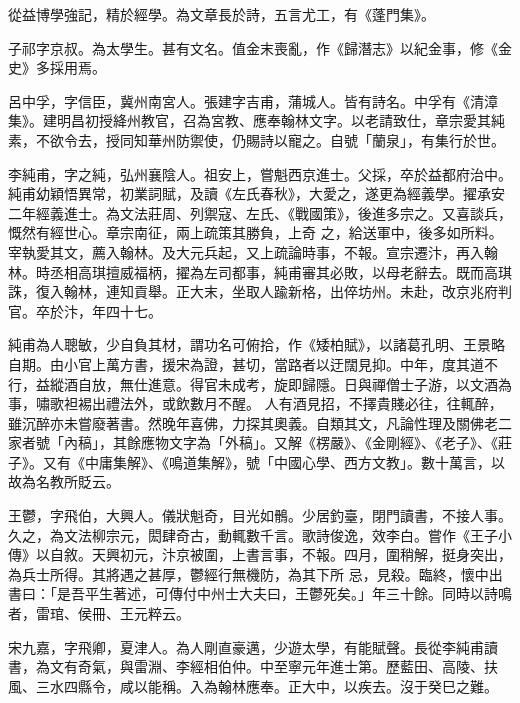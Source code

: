 \begin{pinyinscope}
 從益博學強記，精於經學。為文章長於詩，五言尤工，有《蓬門集》。



 子祁字京叔。為太學生。甚有文名。值金末喪亂，作《歸潛志》以紀金事，修《金史》多採用焉。



 呂中孚，字信臣，冀州南宮人。張建字吉甫，蒲城人。皆有詩名。中孚有《清漳集》。建明昌初授絳州教官，召為宮教、應奉翰林文字。以老請致仕，章宗愛其純素，不欲令去，授同知華州防禦使，仍賜詩以寵之。自號「蘭泉」，有集行於世。



 李純甫，字之純，弘州襄陰人。祖安上，嘗魁西京進士。父採，卒於益都府治中。純甫幼穎悟異常，初業詞賦，及讀《左氏春秋》，大愛之，遂更為經義學。擢承安二年經義進士。為文法莊周、列禦寇、左氏、《戰國策》，後進多宗之。又喜談兵，慨然有經世心。章宗南征，兩上疏策其勝負，上奇
 之，給送軍中，後多如所料。宰執愛其文，薦入翰林。及大元兵起，又上疏論時事，不報。宣宗遷汴，再入翰林。時丞相高琪擅威福柄，擢為左司都事，純甫審其必敗，以母老辭去。既而高琪誅，復入翰林，連知貢舉。正大末，坐取人踰新格，出倅坊州。未赴，改京兆府判官。卒於汴，年四十七。



 純甫為人聰敏，少自負其材，謂功名可俯拾，作《矮柏賦》，以諸葛孔明、王景略自期。由小官上萬方書，援宋為證，甚切，當路者以迂闊見抑。中年，度其道不行，益縱酒自放，無仕進意。得官未成考，旋即歸隱。日與禪僧士子游，以文酒為事，嘯歌袒裼出禮法外，或飲數月不醒。
 人有酒見招，不擇貴賤必往，往輒醉，雖沉醉亦未嘗廢著書。然晚年喜佛，力探其奧義。自類其文，凡論性理及關佛老二家者號「內稿」，其餘應物文字為「外稿」。又解《楞嚴》、《金剛經》、《老子》、《莊子》。又有《中庸集解》、《鳴道集解》，號「中國心學、西方文教」。數十萬言，以故為名教所貶云。



 王鬱，字飛伯，大興人。儀狀魁奇，目光如鶻。少居釣臺，閉門讀書，不接人事。久之，為文法柳宗元，閎肆奇古，動輒數千言。歌詩俊逸，效李白。嘗作《王子小傳》以自敘。天興初元，汴京被圍，上書言事，不報。四月，圍稍解，挺身突出，為兵士所得。其將遇之甚厚，鬱經行無機防，為其下所
 忌，見殺。臨終，懷中出書曰：「是吾平生著述，可傳付中州士大夫曰，王鬱死矣。」年三十餘。同時以詩鳴者，雷琯、侯冊、王元粹云。



 宋九嘉，字飛卿，夏津人。為人剛直豪邁，少遊太學，有能賦聲。長從李純甫讀書，為文有奇氣，與雷淵、李經相伯仲。中至寧元年進士第。歷藍田、高陵、扶風、三水四縣令，咸以能稱。入為翰林應奉。正大中，以疾去。沒于癸巳之難。




\end{pinyinscope}
